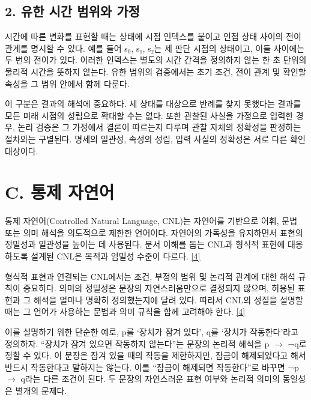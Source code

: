 \documentclass[11pt,a4paper]{article}
\begin{document}
\subsection*{2. 유한 시간 범위와 가정}

시간에 따른 변화를 표현할 때는 상태에 시점 인덱스를 붙이고 인접 상태 사이의 전이 관계를 명시할 수 있다. 예를 들어 s\ensuremath{{}_0}, s₁, s₂는 세 판단 시점의 상태이고, 이들 사이에는 두 번의 전이가 있다. 이러한 인덱스는 별도의 시간 간격을 정의하지 않는 한 초 단위의 물리적 시간을 뜻하지 않는다. 유한 범위의 검증에서는 초기 조건, 전이 관계 및 확인할 속성을 그 범위 안에서 함께 다룬다.\par

이 구분은 결과의 해석에 중요하다. 세 상태를 대상으로 반례를 찾지 못했다는 결과를 모든 미래 시점의 성립으로 확대할 수는 없다. 또한 관찰된 사실을 가정으로 입력한 경우, 논리 검증은 그 가정에서 결론이 따르는지 다루며 관찰 자체의 정확성을 판정하는 절차와는 구별된다. 명세의 일관성, 속성의 성립, 입력 사실의 정확성은 서로 다른 확인 대상이다.\par

\section*{C. 통제 자연어}

통제 자연어(Controlled Natural Language, CNL)는 자연어를 기반으로 어휘, 문법 또는 의미 해석을 의도적으로 제한한 언어이다. 자연어의 가독성을 유지하면서 표현의 정밀성과 일관성을 높이는 데 사용된다. 문서 이해를 돕는 CNL과 형식적 표현에 대응하도록 설계된 CNL은 목적과 엄밀성 수준이 다르다. \href{\detokenize{https://aclanthology.org/J14-1005/}}{[4]}\par

형식적 표현과 연결되는 CNL에서는 조건, 부정의 범위 및 논리적 관계에 대한 해석 규칙이 중요하다. 의미의 정밀성은 문장의 자연스러움만으로 결정되지 않으며, 허용된 표현과 그 해석을 얼마나 명확히 정의했는지에 달려 있다. 따라서 CNL의 성질을 설명할 때는 그 언어가 사용하는 문법과 의미 규칙을 함께 고려해야 한다. \href{\detokenize{https://aclanthology.org/J14-1005/}}{[4]}\par

이를 설명하기 위한 단순한 예로, p를 ‘장치가 잠겨 있다’, q를 ‘장치가 작동한다’라고 정의하자. “장치가 잠겨 있으면 작동하지 않는다”는 문장의 논리적 해석을 p \ensuremath{\rightarrow} ¬q로 정할 수 있다. 이 문장은 잠겨 있을 때의 작동을 제한하지만, 잠금이 해제되었다고 해서 반드시 작동한다고 말하지는 않는다. 이를 “잠금이 해제되면 작동한다”로 바꾸면 ¬p \ensuremath{\rightarrow} q라는 다른 조건이 된다. 두 문장의 자연스러운 표현 여부와 논리적 의미의 동일성은 별개의 문제다.\par
\end{document}
